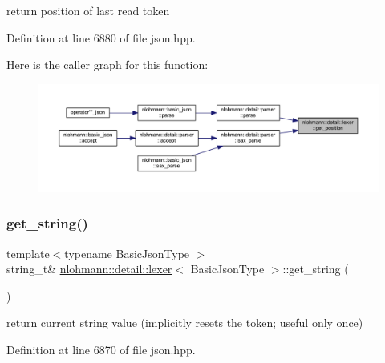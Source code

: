 return position of last read token 



Definition at line 6880 of file json.\+hpp.

Here is the caller graph for this function\+:
\nopagebreak
\begin{figure}[H]
\begin{center}
\leavevmode
\includegraphics[width=350pt]{classnlohmann_1_1detail_1_1lexer_abf5143501435f9f79898c1ff238c2622_icgraph}
\end{center}
\end{figure}
\mbox{\label{classnlohmann_1_1detail_1_1lexer_a54aa290ff2f60218a8f35f1ebf81666d}} 
\subsubsection{\texorpdfstring{get\_string()}{get\_string()}}
{\footnotesize\ttfamily template$<$typename Basic\+Json\+Type $>$ \\
string\+\_\+t\& \mbox{\hyperlink{classnlohmann_1_1detail_1_1lexer}{nlohmann\+::detail\+::lexer}}$<$ Basic\+Json\+Type $>$\+::get\+\_\+string (\begin{DoxyParamCaption}{ }\end{DoxyParamCaption})\hspace{0.3cm}{\ttfamily [inline]}}



return current string value (implicitly resets the token; useful only once) 



Definition at line 6870 of file json.\+hpp.

\mbox{\label{classnlohmann_1_1detail_1_1lexer_a4aef7e72e539be04e139c34872421f2a}} 
